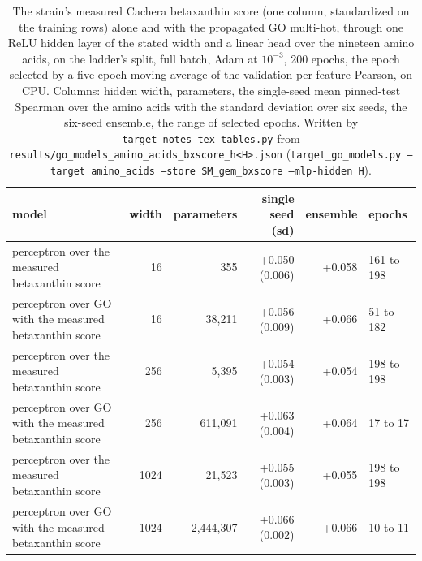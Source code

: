 \begin{table}[H]
  \centering
  \footnotesize
  \caption[The betaxanthin score through a perceptron, by hidden width]{The strain's measured Cachera betaxanthin score (one column, standardized on the training rows) alone and with the propagated GO multi-hot, through one ReLU hidden layer of the stated width and a linear head over the nineteen amino acids, on the ladder's split, full batch, Adam at $10^{-3}$, 200 epochs, the epoch selected by a five-epoch moving average of the validation per-feature Pearson, on CPU. Columns: hidden width, parameters, the single-seed mean pinned-test Spearman over the amino acids with the standard deviation over six seeds, the six-seed ensemble, the range of selected epochs. Written by \texttt{target\_notes\_tex\_tables.py} from \texttt{results/go\_models\_amino\_acids\_bxscore\_h<H>.json} (\texttt{target\_go\_models.py --target amino\_acids --store SM\_gem\_bxscore --mlp-hidden H}).}
  \label{tab:score-mlp-sweep}
  \begin{tabular}{@{}lrrrrl@{}}
    \hline
    model & width & parameters & single seed (sd) & ensemble & epochs \\
    \hline
    perceptron over the measured betaxanthin score & 16 & 355 & +0.050 (0.006) & +0.058 & 161 to 198 \\
    perceptron over GO with the measured betaxanthin score & 16 & 38,211 & +0.056 (0.009) & +0.066 & 51 to 182 \\
    perceptron over the measured betaxanthin score & 256 & 5,395 & +0.054 (0.003) & +0.054 & 198 to 198 \\
    perceptron over GO with the measured betaxanthin score & 256 & 611,091 & +0.063 (0.004) & +0.064 & 17 to 17 \\
    perceptron over the measured betaxanthin score & 1024 & 21,523 & +0.055 (0.003) & +0.055 & 198 to 198 \\
    perceptron over GO with the measured betaxanthin score & 1024 & 2,444,307 & +0.066 (0.002) & +0.066 & 10 to 11 \\
    \hline
  \end{tabular}
\end{table}
